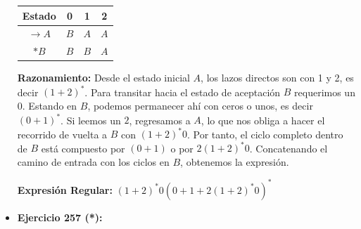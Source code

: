 \documentclass[12pt]{article}
\begin{document}
\begin{itemize}
    \begin{minipage}{0.4\textwidth}
    \begin{tabular}{|c|c|c|c|}
    \hline
    \textbf{Estado} & \textbf{0} & \textbf{1} & \textbf{2} \\
    \hline
    $\rightarrow A$ & $B$ & $A$ & $A$ \\
    \hline
    $*B$ & $B$ & $B$ & $A$ \\
    \hline
    \end{tabular}
    \end{minipage}
    \begin{minipage}{0.5\textwidth}
    \end{minipage}

    \vspace{0.2cm}
    \textbf{Razonamiento:} Desde el estado inicial $A$, los lazos directos son con 1 y 2, es decir $(1+2)^*$. Para transitar hacia el estado de aceptación $B$ requerimos un $0$. Estando en $B$, podemos permanecer ahí con ceros o unos, es decir $(0+1)^*$. Si leemos un $2$, regresamos a $A$, lo que nos obliga a hacer el recorrido de vuelta a $B$ con $(1+2)^*0$. Por tanto, el ciclo completo dentro de $B$ está compuesto por $(0+1)$ o por $2(1+2)^*0$. Concatenando el camino de entrada con los ciclos en $B$, obtenemos la expresión.
    
    \textbf{Expresión Regular:} $(1+2)^*0 (0+1 + 2(1+2)^*0)^*$

    \vspace{0.6cm}

    \item \textbf{Ejercicio 257 (*):}
    

\end{itemize}
\end{document}
